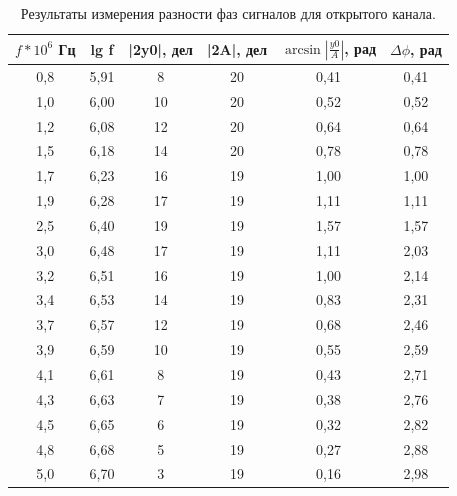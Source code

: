 \documentclass[12pt,a4paper]{article}
\begin{document}
	\begin{table}[]
	\begin{center}
		\begin{tabular}{|c|c|c|c|c|c|}
			\hline
			$ f * 10^{6}$ Гц      & lg f & |2y0|, дел & |2A|, дел & $\arcsin\left|\frac{y0}{A}\right|$, рад & $\Delta\phi$, рад \\ \hline
			0,8  & 5,91 & 8     & 20   & 0,41   & 0,41     \\ \hline
			1,0 & 6,00 & 10    & 20   & 0,52   & 0,52     \\ \hline
			1,2 & 6,08 & 12    & 20   & 0,64   & 0,64     \\ \hline
			1,5 & 6,18 & 14    & 20   & 0,78   & 0,78     \\ \hline
			1,7 & 6,23 & 16    & 19   & 1,00   & 1,00     \\ \hline
			1,9 & 6,28 & 17    & 19   & 1,11   & 1,11     \\ \hline
			2,5 & 6,40 & 19    & 19   & 1,57   & 1,57     \\ \hline
			3,0 & 6,48 & 17    & 19   & 1,11   & 2,03     \\ \hline	
			3,2 & 6,51 & 16    & 19   & 1,00   & 2,14     \\ \hline	
			3,4 & 6,53 & 14    & 19   & 0,83   & 2,31     \\ \hline
			3,7 & 6,57 & 12    & 19   & 0,68   & 2,46     \\ \hline
			3,9 & 6,59 & 10    & 19   & 0,55   & 2,59     \\ \hline
			4,1 & 6,61 & 8     & 19   & 0,43   & 2,71     \\ \hline
			4,3 & 6,63 & 7     & 19   & 0,38   & 2,76     \\ \hline
			4,5 & 6,65 & 6     & 19   & 0,32   & 2,82     \\ \hline
			4,8 & 6,68 & 5     & 19   & 0,27   & 2,88     \\ \hline
			5,0 & 6,70 & 3     & 19   & 0,16   & 2,98     \\ \hline
		\end{tabular}
		\caption{Результаты измерения разности фаз сигналов для открытого канала.}
		\label{tab:delta_phases_DC}
	\end{center}
	\end{table}
	
\end{document}
